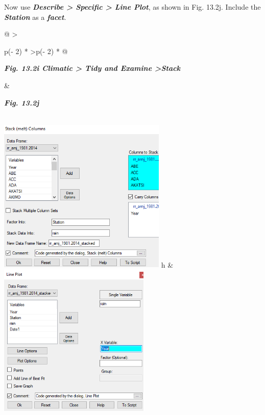 \documentclass[
  letterpaper,
  DIV=11,
  numbers=noendperiod]{scrreprt}
\begin{document}
Now use \textbf{\emph{Describe \textgreater{} Specific \textgreater{}
Line Plot}}, as shown in Fig. 13.2j. Include the \textbf{\emph{Station}}
as a \textbf{\emph{facet}}.

\begin{longtable}[]{@{}
  >{\raggedright\arraybackslash}p{(\columnwidth - 2\tabcolsep) * }
  >{\centering\arraybackslash}p{(\columnwidth - 2\tabcolsep) * }@{}}
\toprule\noalign{}
\begin{minipage}[b]{\linewidth}\raggedright
\textbf{\emph{Fig. 13.2i Climatic \textgreater{} Tidy and Examine
\textgreater Stack}}
\end{minipage} & \begin{minipage}[b]{\linewidth}\centering
\textbf{\emph{Fig. 13.2j}}
\end{minipage} \\
\midrule\noalign{}
\endhead
\bottomrule\noalign{}
\endlastfoot
\includegraphics[width=3.15839in,height=2.91378in]{figures/Fig13.2i.png}
h &
\includegraphics[width=2.84737in,height=\textheight]{figures/Fig13.2j.png} \\
\end{longtable}
\end{document}
